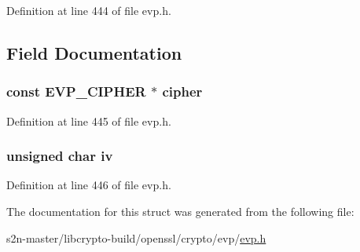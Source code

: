 Definition at line 444 of file evp.\+h.



\subsection{Field Documentation}
\subsubsection[{\texorpdfstring{cipher}{cipher}}]{\setlength{\rightskip}{0pt plus 5cm}const {\bf E\+V\+P\+\_\+\+C\+I\+P\+H\+ER} $\ast$ cipher}\hypertarget{structevp__cipher__info__st_a535356548694b85372c7d1fb18e05f1d}{}\label{structevp__cipher__info__st_a535356548694b85372c7d1fb18e05f1d}


Definition at line 445 of file evp.\+h.

\subsubsection[{\texorpdfstring{iv}{iv}}]{\setlength{\rightskip}{0pt plus 5cm}unsigned char iv}\hypertarget{structevp__cipher__info__st_a6c9c7c6ccc60886208223861223467ff}{}\label{structevp__cipher__info__st_a6c9c7c6ccc60886208223861223467ff}


Definition at line 446 of file evp.\+h.



The documentation for this struct was generated from the following file\+:\begin{DoxyCompactItemize}
\item 
s2n-\/master/libcrypto-\/build/openssl/crypto/evp/\hyperlink{crypto_2evp_2evp_8h}{evp.\+h}\end{DoxyCompactItemize}
